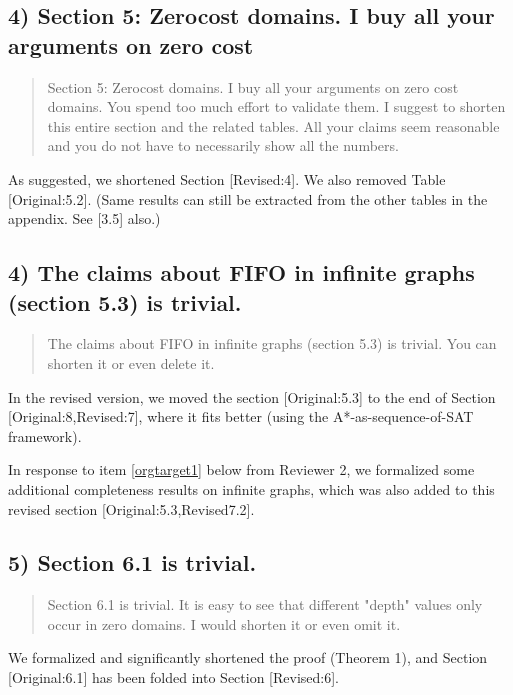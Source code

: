 \documentclass{article}
\begin{document}
\subsection{4) Section 5: Zerocost domains. I buy all your arguments on zero cost}
\label{sec:orgheadline4}

\begin{quote}
Section 5: Zerocost domains. I buy all your arguments on zero cost
domains. You spend too much effort to validate them. I suggest to
shorten this entire section and the related tables. All your claims
seem reasonable and you do not have to necessarily show all the
numbers.
\end{quote}

As suggested, we shortened Section [Revised:4].
We also removed Table [Original:5.2].
(Same results can still be extracted from the other tables in the appendix. See [3.5] also.)

\subsection{4)  The claims about FIFO in infinite graphs (section 5.3) is trivial.}
\label{sec:orgheadline5}

\begin{quote}
The claims about FIFO in infinite graphs (section 5.3) is trivial. You can shorten it or even delete it.
\end{quote}

In the revised version, we moved the section [Original:5.3] to the end of Section [Original:8,Revised:7],
where it fits better (using the A*-as-sequence-of-SAT framework).

In response to item \ref{orgtarget1} below from Reviewer 2, 
we formalized some additional completeness results on infinite graphs,
which was also added to this revised section [Original:5.3,Revised7.2].

\subsection{5) Section 6.1 is trivial.}
\label{sec:orgheadline6}

\begin{quote}
Section 6.1 is trivial. It is easy to see that different "depth"
values only occur in zero domains. I would shorten it or even omit it.
\end{quote}

We formalized and significantly shortened the proof (Theorem 1),
and Section [Original:6.1] has been folded into Section [Revised:6].
\end{document}
